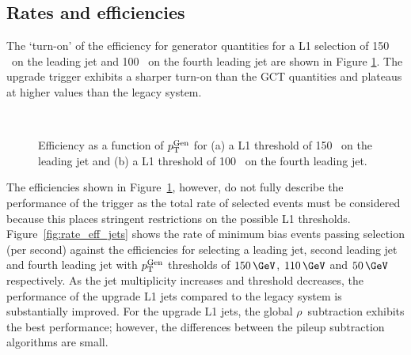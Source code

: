 \subsection{Rates and efficiencies}

The `turn-on' of the efficiency for generator quantities for a L1 selection of 150 \GeV~on the leading jet
and 100 \GeV~on the fourth leading jet are shown in Figure \ref{fig:turnon}. The upgrade trigger exhibits a sharper turn-on
than the GCT quantities and plateaus at higher values than the legacy system. 

\begin{figure}
    \begin{center} 
	~
	\caption{Efficiency as a function of ${p_{\text T}^{\text{Gen}}}$ for (a) a L1 threshold of 150 \GeV~on the leading jet and (b) 
	a L1 threshold of 100 \GeV~on the fourth leading jet.}
	    \label{fig:turnon}
    \end{center} 
\end{figure}

The efficiencies shown in Figure~\ref{fig:turnon}, however, do not fully describe the performance 
of the trigger as the total rate of selected events must be considered because this places 
stringent restrictions on the possible L1 thresholds. Figure~\ref{fig:rate_eff_jets} shows the rate of 
minimum bias events passing selection (per second) against the efficiencies for selecting 
a leading jet, second leading jet and fourth leading jet with ${p_{\text T}^{\text{Gen}}}$ thresholds of $150\,\GeV$,
$110\,\GeV$ and $50\,\GeV$ respectively. As the jet multiplicity increases and threshold decreases,
the performance of the upgrade L1 jets compared to the legacy system is substantially improved.
For the upgrade L1 jets, the global $\rho$~subtraction exhibits the best performance; however, the differences 
between the pileup subtraction algorithms are small.

